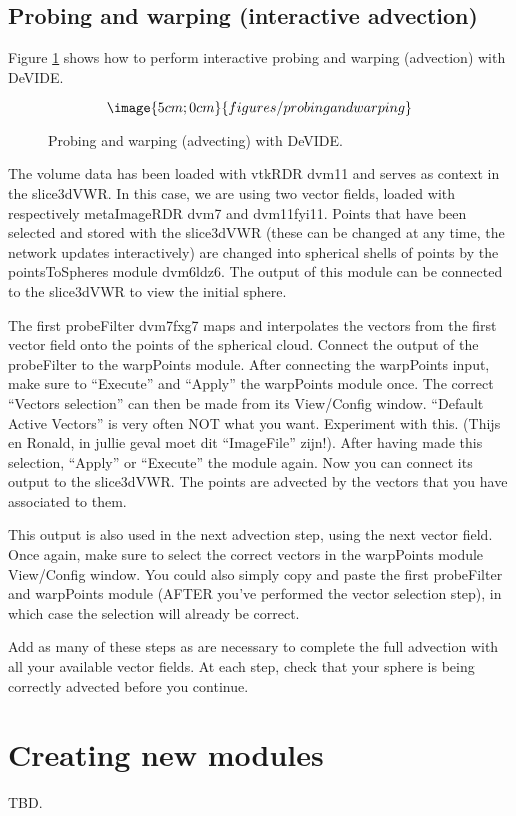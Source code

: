 \section{Probing and warping (interactive advection)}
Figure \ref{figPAW} shows how to perform interactive probing and
warping (advection) with DeVIDE.

\begin{figure}
$$\image{5cm;0cm}{figures/probingandwarping}$$
\caption{Probing and warping (advecting) with DeVIDE.}\label{figPAW}
\end{figure}

The volume data has been loaded with vtkRDR dvm11 and serves as
context in the slice3dVWR.  In this case, we are using two vector
fields, loaded with respectively metaImageRDR dvm7 and dvm11fyi11.
Points that have been selected and stored with the slice3dVWR (these
can be changed at any time, the network updates interactively) are
changed into spherical shells of points by the pointsToSpheres module
dvm6ldz6.  The output of this module can be connected to the
slice3dVWR to view the initial sphere.

The first probeFilter dvm7fxg7 maps and interpolates the vectors from
the first vector field onto the points of the spherical cloud.
Connect the output of the probeFilter to the warpPoints module.  After
connecting the warpPoints input, make sure to ``Execute'' and
``Apply'' the warpPoints module once.  The correct ``Vectors
selection'' can then be made from its View/Config window.  ``Default
Active Vectors'' is very often NOT what you want.  Experiment with
this.  (Thijs en Ronald, in jullie geval moet dit ``ImageFile''
zijn!).  After having made this selection, ``Apply'' or ``Execute''
the module again.  Now you can connect its output to the slice3dVWR.
The points are advected by the vectors that you have associated to
them.

This output is also used in the next advection step, using the next
vector field.  Once again, make sure to select the correct vectors in
the warpPoints module View/Config window.  You could also simply copy
and paste the first probeFilter and warpPoints module (AFTER you've
performed the vector selection step), in which case the selection will
already be correct.

Add as many of these steps as are necessary to complete the full
advection with all your available vector fields.  At each step, check
that your sphere is being correctly advected before you continue.

\chapter{Creating new modules}
TBD.

%

%
\setfooter{\thepage}{}{}{}{}{\thepage}%
\printindex%


